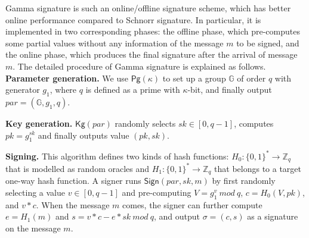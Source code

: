 \documentclass[journal]{IEEEtran}
\begin{document}
Gamma signature \cite{01DBLP:journals/tifs/YaoZ13} is such an online/offline signature scheme, which has better online performance compared to Schnorr signature. In particular, it is implemented in two corresponding phases: the offline phase, which pre-computes some partial values without any information of the message \(m\) to be signed, and the online phase, which produces the final signature after the arrival of message \(m\). The detailed procedure of Gamma signature is explained as follows.\\

%

\noindent\textbf{Parameter generation.} We use \(\textsf{Pg}(\kappa)\) to set up a group \(\mathbb{G}\) of order \(q\)  with generator \(g_1\), where \(q\) is defined as a prime with  \(\kappa\)-bit, and finally output \(par=(\mathbb{G},g_1,q)\).

\noindent\textbf{Key generation.} \(\textsf{Kg}(par)\) randomly selects \(sk\in [0,q-1]\), computes \(pk= g_1^{sk}\) and finally outputs value \((pk,sk)\).

\noindent\textbf{Signing.} This algorithm defines two kinds of hash functions: \(H_0:\{0,1\}^*\rightarrow\mathbb{Z}_q\) that is modelled as random oracles and \(H_1:\{0,1\}^*\rightarrow\mathbb{Z}_q\) that belongs to a target one-way hash function. A signer runs \(\textsf{Sign}(par,sk,m)\) by first randomly selecting a value \(v\in[0,q-1]\) and pre-computing \(V=g_1^v\ mod\ q\), \(c=H_0(V,pk)\), and \(v*c\). When the message \(m\) comes, the signer can further compute \(e=H_1(m)\) and \(s=v*c-e*sk\ mod\ q\), and output \(\sigma= (c,s)\) as a signature on the message \(m\).
\end{document}

